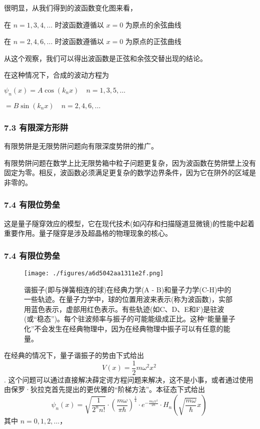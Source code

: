 很明显，从我们得到的波函数变化图来看，

在 $n = 1, 3, 4, \ldots$ 时波函数遵循以 $x = 0$ 为原点的余弦曲线

在 $n = 2, 4, 6, \ldots$ 时波函数遵循以 $x = 0$ 为原点的正弦曲线

从这个观察，我们可以得出波函数是正弦和余弦交替出现的结论。

在这种情况下，合成的波动方程为

$\psi_n(x) = A \cos(k_n x) \quad n = 1, 3, 5, \ldots$

$ = B \sin(k_n x) \quad n = 2, 4, 6, \ldots$

\subsubsection{7.3 有限深方形阱}
有限势阱是无限势阱问题向有限深度势阱的推广。

有限势阱问题在数学上比无限势箱中粒子问题更复杂，因为波函数在势阱壁上没有固定为零。相反，波函数必须满足更复杂的数学边界条件，因为它在阱外的区域是非零的。

\subsubsection{7.4 有限位势垒}
这是量子隧穿效应的模型，它在现代技术(如闪存和扫描隧道显微镜)的性能中起着重要作用。量子隧穿是涉及超晶格的物理现象的核心。

\subsubsection{7.4 有限位势垒}
\begin{figure}[ht]
\centering
\texttt{[image: ./figures/a6d5042aa1311e2f.png]}
\caption{谐振子(即与弹簧相连的球)在经典力学(A - B)和量子力学(C-H)中的一些轨迹。在量子力学中，球的位置用波来表示(称为波函数)，实部用蓝色表示，虚部用红色表示。有些轨迹(如C、D、E和F)是驻波(或“稳态”)。每个驻波频率与振子的可能能级成正比。这种“能量量子化”不会发生在经典物理中，因为在经典物理中振子可以有任意的能量。} \label{fig_LZLX_9}
\end{figure}
在经典的情况下，量子谐振子的势由下式给出
$$V(x) = \frac{1}{2}m\omega^2 x^2~$$.
这个问题可以通过直接解决薛定谔方程问题来解决，这不是小事，或者通过使用由保罗·狄拉克首先提出的更优雅的“阶梯方法”。本征态下式给出
$$\psi_n(x) = \sqrt{\frac{1}{2^n n!}} \cdot \left(\frac{m\omega}{\pi\hbar}\right)^\frac{1}{4} \cdot e^{-\frac{m\omega x^2}{2\hbar}} \cdot H_n \left(\sqrt{\frac{m\omega}{\hbar}} x\right)~$$
其中 $n = 0, 1, 2, \ldots$，

